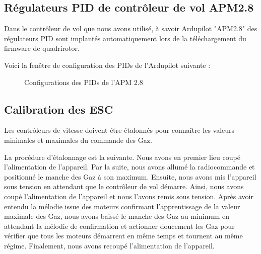 	\subsection{Régulateurs PID de contrôleur de vol APM2.8}
	Dans le contrôleur de vol que nous avons utilisé, à savoir Ardupilot "APM2.8" des régulateurs PID sont implantés automatiquement lors de la téléchargement du firmware de quadrirotor.
	
	Voici la fenêtre de configuration des PIDs de l'Ardupilot suivante :
		\begin{figure} [h]
		\begin{center}
			\centering
		\end{center}
		\caption{Configurations des PIDs de l'APM 2.8}
	\end{figure}

	\subsection{Calibration des ESC}
	Les contrôleurs de vitesse doivent être étalonnés pour connaître les valeurs minimales et maximales du commande des Gaz. 
		
	La procédure d’étalonnage est la suivante. Nous avons en premier lieu coupé l’alimentation de l’appareil. Par la suite, nous avons allumé la radiocommande et positionné le manche des Gaz à son maximum. Ensuite, nous avons mis l’appareil sous tension en attendant que le contrôleur de vol démarre. Ainsi, nous avons coupé l’alimentation de l’appareil et nous l'avons remis sous tension. Après avoir entendu la mélodie issue des moteurs confirmant l'apprentissage de la valeur maximale des Gaz, nous avons baissé le manche des Gaz au minimum en attendant la mélodie de confirmation et actionner doucement les Gaz pour vérifier que tous les moteurs démarrent en même temps et tournent au même régime. Finalement, nous avons recoupé l'alimentation de l'appareil.
